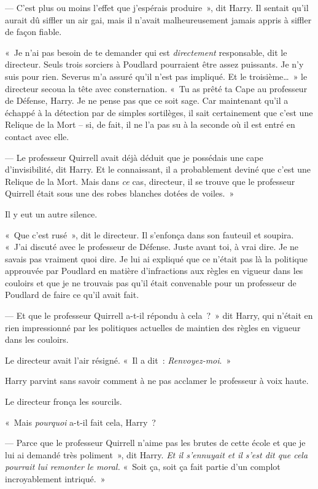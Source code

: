 --- C'est plus ou moins l'effet que j'espérais produire~», dit Harry.
Il sentait qu'il aurait dû siffler un air gai, mais il n'avait malheureusement jamais appris à siffler de façon fiable.

«~Je n'ai pas besoin de te demander qui est \emph{directement} responsable, dit le directeur.
Seuls trois sorciers à Poudlard pourraient être assez puissants.
Je n'y suis pour rien.
Severus m'a assuré qu'il n'est pas impliqué.
Et le troisième…~»
le directeur secoua la tête avec consternation.
«~Tu as prêté ta Cape au professeur de Défense, Harry.
Je ne pense pas que ce soit sage.
Car maintenant qu'il a échappé à la détection par de simples sortilèges, il sait certainement que c'est une Relique de la Mort -- si, de fait, il ne l'a pas su à la seconde où il est entré en contact avec elle.

--- Le professeur Quirrell avait déjà déduit que je possédais une cape d'invisibilité, dit Harry.
Et le connaissant, il a probablement deviné que c'est une Relique de la Mort.
Mais dans \emph{ce} cas, directeur, il se trouve que le professeur Quirrell était sous une des robes blanches dotées de voiles.~»

Il y eut un autre silence.

«~Que c'est rusé~», dit le directeur.
Il s'enfonça dans son fauteuil et soupira.
«~J'ai discuté avec le professeur de Défense.
Juste avant toi, à vrai dire.
Je ne savais pas vraiment quoi dire.
Je lui ai expliqué que ce n'était pas là la politique approuvée par Poudlard en matière d'infractions aux règles en vigueur dans les couloirs et que je ne trouvais pas qu'il était convenable pour un professeur de Poudlard de faire ce qu'il avait fait.

--- Et que le professeur Quirrell a-t-il répondu à cela~?~»
dit Harry, qui n'était en rien impressionné par les politiques actuelles de maintien des règles en vigueur dans les couloirs.

Le directeur avait l'air résigné.
«~Il a dit~: \emph{Renvoyez-moi}.~»

Harry parvint sans savoir comment à ne pas acclamer le professeur à voix haute.

Le directeur fronça les sourcils.

«~Mais \emph{pourquoi} a-t-il fait cela, Harry~?

--- Parce que le professeur Quirrell n'aime pas les brutes de cette école et que je lui ai demandé très poliment~», dit Harry.
\emph{Et il s'ennuyait et il s'est dit que cela pourrait lui remonter le moral.} «~Soit ça, soit ça fait partie d'un complot incroyablement intriqué.~»

